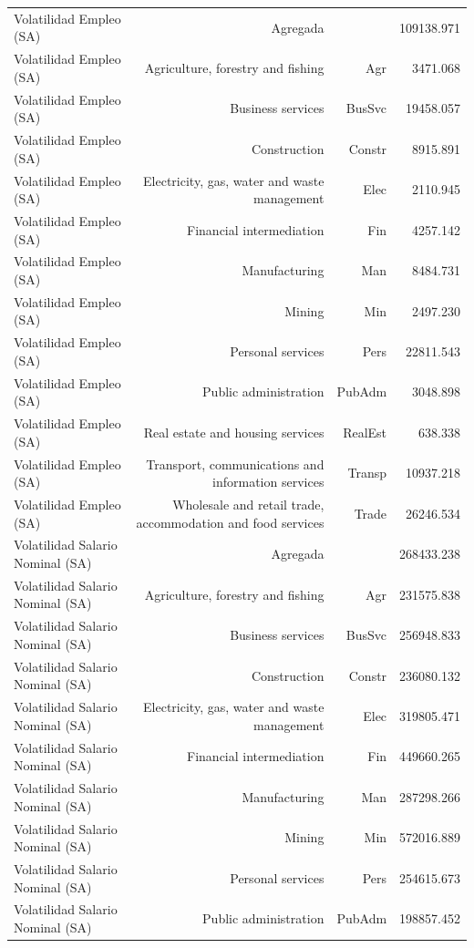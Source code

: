 \begin{longtable}{lrrr}
Volatilidad Empleo (SA) & Agregada &  & 109138.971 \\ 
Volatilidad Empleo (SA) & Agriculture, forestry and fishing & Agr & 3471.068 \\ 
Volatilidad Empleo (SA) & Business services & BusSvc & 19458.057 \\ 
Volatilidad Empleo (SA) & Construction & Constr & 8915.891 \\ 
Volatilidad Empleo (SA) & Electricity, gas, water and waste management & Elec & 2110.945 \\ 
Volatilidad Empleo (SA) & Financial intermediation & Fin & 4257.142 \\ 
Volatilidad Empleo (SA) & Manufacturing & Man & 8484.731 \\ 
Volatilidad Empleo (SA) & Mining & Min & 2497.230 \\ 
Volatilidad Empleo (SA) & Personal services & Pers & 22811.543 \\ 
Volatilidad Empleo (SA) & Public administration & PubAdm & 3048.898 \\ 
Volatilidad Empleo (SA) & Real estate and housing services & RealEst & 638.338 \\ 
Volatilidad Empleo (SA) & Transport, communications and information services & Transp & 10937.218 \\ 
Volatilidad Empleo (SA) & Wholesale and retail trade, accommodation and food services & Trade & 26246.534 \\ 
Volatilidad Salario Nominal (SA) & Agregada &  & 268433.238 \\ 
Volatilidad Salario Nominal (SA) & Agriculture, forestry and fishing & Agr & 231575.838 \\ 
Volatilidad Salario Nominal (SA) & Business services & BusSvc & 256948.833 \\ 
Volatilidad Salario Nominal (SA) & Construction & Constr & 236080.132 \\ 
Volatilidad Salario Nominal (SA) & Electricity, gas, water and waste management & Elec & 319805.471 \\ 
Volatilidad Salario Nominal (SA) & Financial intermediation & Fin & 449660.265 \\ 
Volatilidad Salario Nominal (SA) & Manufacturing & Man & 287298.266 \\ 
Volatilidad Salario Nominal (SA) & Mining & Min & 572016.889 \\ 
Volatilidad Salario Nominal (SA) & Personal services & Pers & 254615.673 \\ 
Volatilidad Salario Nominal (SA) & Public administration & PubAdm & 198857.452 \\ 

\end{longtable}
